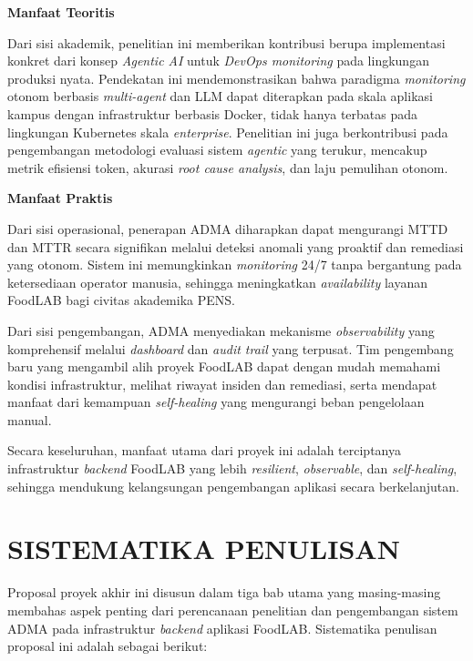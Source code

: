 \textbf{Manfaat Teoritis}

Dari sisi akademik, penelitian ini memberikan kontribusi berupa implementasi konkret dari konsep \textit{Agentic AI} untuk \textit{DevOps monitoring} pada lingkungan produksi nyata. Pendekatan ini mendemonstrasikan bahwa paradigma \textit{monitoring} otonom berbasis \textit{multi-agent} dan LLM dapat diterapkan pada skala aplikasi kampus dengan infrastruktur berbasis Docker, tidak hanya terbatas pada lingkungan Kubernetes skala \textit{enterprise}. Penelitian ini juga berkontribusi pada pengembangan metodologi evaluasi sistem \textit{agentic} yang terukur, mencakup metrik efisiensi token, akurasi \textit{root cause analysis}, dan laju pemulihan otonom.

\textbf{Manfaat Praktis}

Dari sisi operasional, penerapan ADMA diharapkan dapat mengurangi MTTD dan MTTR secara signifikan melalui deteksi anomali yang proaktif dan remediasi yang otonom. Sistem ini memungkinkan \textit{monitoring} 24/7 tanpa bergantung pada ketersediaan operator manusia, sehingga meningkatkan \textit{availability} layanan FoodLAB bagi civitas akademika PENS.

Dari sisi pengembangan, ADMA menyediakan mekanisme \textit{observability} yang komprehensif melalui \textit{dashboard} dan \textit{audit trail} yang terpusat. Tim pengembang baru yang mengambil alih proyek FoodLAB dapat dengan mudah memahami kondisi infrastruktur, melihat riwayat insiden dan remediasi, serta mendapat manfaat dari kemampuan \textit{self-healing} yang mengurangi beban pengelolaan manual.

Secara keseluruhan, manfaat utama dari proyek ini adalah terciptanya infrastruktur \textit{backend} FoodLAB yang lebih \textit{resilient}, \textit{observable}, dan \textit{self-healing}, sehingga mendukung kelangsungan pengembangan aplikasi secara berkelanjutan.

\section{SISTEMATIKA PENULISAN}

Proposal proyek akhir ini disusun dalam tiga bab utama yang masing-masing membahas aspek penting dari perencanaan penelitian dan pengembangan sistem ADMA pada infrastruktur \textit{backend} aplikasi FoodLAB. Sistematika penulisan proposal ini adalah sebagai berikut:


